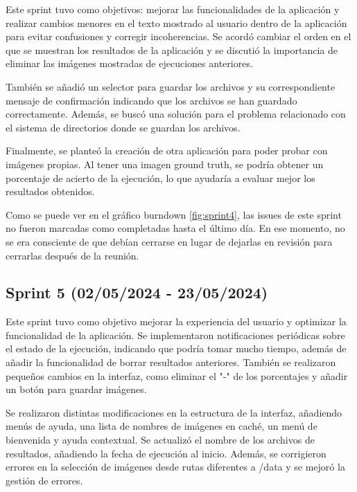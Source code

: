 Este sprint tuvo como objetivos: mejorar las funcionalidades de la aplicación y realizar cambios menores en el texto mostrado al usuario dentro de la aplicación para evitar confusiones y corregir incoherencias. Se acordó cambiar el orden en el que se muestran los resultados de la aplicación y se discutió la importancia de eliminar las imágenes mostradas de ejecuciones anteriores.

También se añadió un selector para guardar los archivos y su correspondiente mensaje de confirmación indicando que los archivos se han guardado correctamente. Además, se buscó una solución para el problema relacionado con el sistema de directorios donde se guardan los archivos.

Finalmente, se planteó la creación de otra aplicación para poder probar con imágenes propias. Al tener una imagen ground truth, se podría obtener un porcentaje de acierto de la ejecución, lo que ayudaría a evaluar mejor los resultados obtenidos.


Como se puede ver en el gráfico burndown \ref{fig:sprint4}, las issues de este sprint no fueron marcadas como completadas hasta el último día. En ese momento, no se era consciente de que debían cerrarse en lugar de dejarlas en revisión para cerrarlas después de la reunión.


\subsection{Sprint 5 (02/05/2024 - 23/05/2024)}\label{sprint-5}

Este sprint tuvo como objetivo mejorar la experiencia del usuario y optimizar la funcionalidad de la aplicación. Se implementaron notificaciones periódicas sobre el estado de la ejecución, indicando que podría tomar mucho tiempo, además de añadir la funcionalidad de borrar resultados anteriores. También se realizaron pequeños cambios en la interfaz, como eliminar el "-" de los porcentajes y añadir un botón para guardar imágenes.

Se realizaron distintas modificaciones en la estructura de la interfaz, añadiendo menús de ayuda, una lista de nombres de imágenes en caché, un menú de bienvenida y ayuda contextual. Se actualizó el nombre de los archivos de resultados, añadiendo la fecha de ejecución al inicio. Además, se corrigieron errores en la selección de imágenes desde rutas diferentes a /data y se mejoró la gestión de errores.

